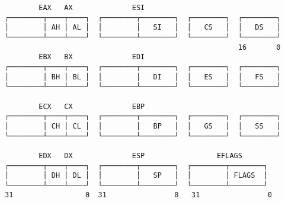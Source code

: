 \documentclass[varwidth=40em]{standalone}
\begin{document}
\begin{verbatim}
        EAX   AX              ESI
┌────────┬────┬────┐  ┌────────┬────────┐  ┌────────┐  ┌────────┐
│        │ AH │ AL │  │        │   SI   │  │   CS   │  │   DS   │
└────────┴────┴────┘  └────────┴────────┘  └────────┘  └────────┘
                                                       16       0
        EBX   BX              EDI
┌────────┬────┬────┐  ┌────────┬────────┐  ┌────────┐  ┌────────┐
│        │ BH │ BL │  │        │   DI   │  │   ES   │  │   FS   │
└────────┴────┴────┘  └────────┴────────┘  └────────┘  └────────┘

        ECX   CX              EBP
┌────────┬────┬────┐  ┌────────┬────────┐  ┌────────┐  ┌────────┐
│        │ CH │ CL │  │        │   BP   │  │   GS   │  │   SS   │
└────────┴────┴────┘  └────────┴────────┘  └────────┘  └────────┘

        EDX   DX              ESP                 EFLAGS
┌────────┬────┬────┐  ┌────────┬────────┐  ┌────────┬────────┐
│        │ DH │ DL │  │        │   SP   │  │        │ FLAGS  │
└────────┴────┴────┘  └────────┴────────┘  └────────┴────────┘
31                 0  31                0   31                0
\end{verbatim}
\end{document}
